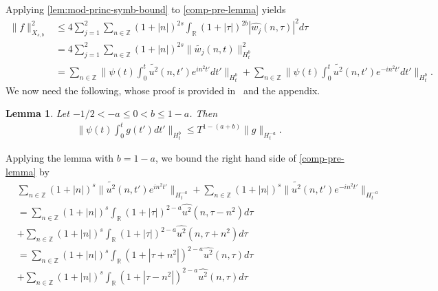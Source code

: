 \documentclass[12pt,reqno]{amsart}
\numberwithin{equation}{section}  %
\numberwithin{figure}{section}
\newcommand{\rr}{\mathbb{R}}
\newcommand{\zz}{\mathbb{Z}}
\newcommand{\wh}{\widehat}
\newcommand{\wt}{\widetilde}
\theoremstyle{plain}
\newtheorem{lemma}{Lemma}
\theoremstyle{definition}
\theoremstyle{remark}
\begin{document}
%
%
Applying \autoref{lem:mod-princ-symb-bound} to \eqref{comp-pre-lemma} yields
%
%
\begin{equation*}
\begin{split}
\| f \|_{X_{s,b}}^{2}
  & \le 4 \sum_{j=1}^{2}  \sum_{n \in \zz} (1 + |n|)^{2s} \int_{\rr} (1 + |
  \tau|)^{2b} | \wh{w_{j}}(n, \tau)|^2 d \tau
  \\
  & = 4 \sum_{j=1}^{2} \sum_{n \in \zz} (1 + |n|)^{2s} \|\wt{w_{j}}(n, t)
  \|^{2}_{H_{t}^{b}}
  \\
  & = \sum_{n \in \zz} \| \psi(t) \int_{0}^{t} \wt{u^2}(n, t')
  e^{in^{2}t'}dt'  \|_{H_{t}^{b}}
  + 
  \sum_{n \in \zz} \| \psi(t) \int_{0}^{t} \wt{u^2}(n, t')
  e^{-in^{2}t'}dt'  \|_{H_{t}^{b}}.
\end{split}
\end{equation*}
%
We now need the following, whose proof is provided in~\cite{Ginibre:1996fk} and
the appendix.
%
%
%
%
%
%
%
%
\begin{lemma}
Let $-1/2 < -a \le 0 < b \le 1-a$. Then
%
%
\begin{equation*}
\begin{split}
  \| \psi(t) \int_{0}^{t} g(t') dt' \|_{H^{b}_{t}} \le T^{1-(a+b)} \| g
  \|_{H_{t}^{-a}}.
\end{split}
\end{equation*}
%
%
\label{lem:pre-bilin-est}
\end{lemma}
%
%
Applying the lemma with $b = 1 - a$, we bound the right hand side of \eqref{comp-pre-lemma} by
%
%
\begin{equation*}
\begin{split}
  & \sum_{n \in \zz} (1 + |n|)^{s} \| \wt{u^{2}}(n, t')
  e^{in^{2}t'} \|_{H_{t}^{-a}}  +
  \sum_{n \in \zz} (1 + |n|)^{s} \| \wt{u^{2}}(n, t')
  e^{-in^{2}t'} \|_{H_{t}^{-a}} 
  \\
  & = \sum_{n \in \zz} (1 + |n|)^{s} \int_{\rr} (1 + | \tau
  |)^{2-a} \wh{u^{2}}(n, \tau - n^{2}) d \tau 
  \\
  & +
  \sum_{n \in \zz} (1 + |n|)^{s} \int_{\rr} (1 + | \tau
  |)^{2-a} \wh{u^{2}}(n, \tau + n^{2}) d \tau 
  \\
  & = \sum_{n \in \zz} (1 + |n|)^{s} \int_{\rr} (1 + | \tau
  + n^{2}
  |)^{2-a} \wh{u^{2}}(n, \tau ) d \tau 
  \\
  & +
  \sum_{n \in \zz} (1 + |n|)^{s} \int_{\rr} (1 + | \tau
  - n^{2} |)^{2-a} \wh{u^{2}}(n, \tau) d \tau  
\end{split}
\end{equation*}
\end{document}
